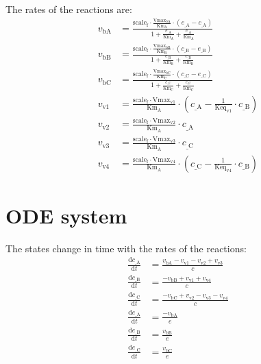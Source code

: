 \documentclass{article}
\begin{document}
The rates of the reactions are:
\begin{align*}
  v_{\mathrm{bA}} &= \frac{\mathrm{scale}_{\mathrm{f}} \cdot \frac{\mathrm{Vmax}_{\mathrm{bA}}}{\mathrm{Km}_{\mathrm{A}}} \cdot \mathopen{}\left(e_{\mathrm{\_A}} - c_{\mathrm{\_A}}\right)}{1 + \frac{e_{\mathrm{\_A}}}{\mathrm{Km}_{\mathrm{A}}} + \frac{c_{\mathrm{\_A}}}{\mathrm{Km}_{\mathrm{A}}}} \\
  v_{\mathrm{bB}} &= \frac{\mathrm{scale}_{\mathrm{f}} \cdot \frac{\mathrm{Vmax}_{\mathrm{bB}}}{\mathrm{Km}_{\mathrm{B}}} \cdot \mathopen{}\left(c_{\mathrm{\_B}} - e_{\mathrm{\_B}}\right)}{1 + \frac{e_{\mathrm{\_B}}}{\mathrm{Km}_{\mathrm{B}}} + \frac{c_{\mathrm{\_B}}}{\mathrm{Km}_{\mathrm{B}}}} \\
  v_{\mathrm{bC}} &= \frac{\mathrm{scale}_{\mathrm{f}} \cdot \frac{\mathrm{Vmax}_{\mathrm{bC}}}{\mathrm{Km}_{\mathrm{C}}} \cdot \mathopen{}\left(c_{\mathrm{\_C}} - e_{\mathrm{\_C}}\right)}{1 + \frac{e_{\mathrm{\_C}}}{\mathrm{Km}_{\mathrm{C}}} + \frac{c_{\mathrm{\_C}}}{\mathrm{Km}_{\mathrm{C}}}} \\
  v_{\mathrm{v1}} &= \frac{\mathrm{scale}_{\mathrm{f}} \cdot \mathrm{Vmax}_{\mathrm{v1}}}{\mathrm{Km}_{\mathrm{A}}} \cdot \mathopen{}\left(c_{\mathrm{\_A}} - \frac{1}{\mathrm{Keq}_{\mathrm{v1}}} \cdot c_{\mathrm{\_B}}\right) \\
  v_{\mathrm{v2}} &= \frac{\mathrm{scale}_{\mathrm{f}} \cdot \mathrm{Vmax}_{\mathrm{v2}}}{\mathrm{Km}_{\mathrm{A}}} \cdot c_{\mathrm{\_A}} \\
  v_{\mathrm{v3}} &= \frac{\mathrm{scale}_{\mathrm{f}} \cdot \mathrm{Vmax}_{\mathrm{v3}}}{\mathrm{Km}_{\mathrm{A}}} \cdot c_{\mathrm{\_C}} \\
  v_{\mathrm{v4}} &= \frac{\mathrm{scale}_{\mathrm{f}} \cdot \mathrm{Vmax}_{\mathrm{v4}}}{\mathrm{Km}_{\mathrm{A}}} \cdot \mathopen{}\left(c_{\mathrm{\_C}} - \frac{1}{\mathrm{Keq}_{\mathrm{v4}}} \cdot c_{\mathrm{\_B}}\right)
\end{align*}

\section{ODE system}

The states change in time with the rates of the reactions:
\begin{align*}
  \frac{\mathrm{d} c_{\mathrm{\_A}}}{\mathrm{d} t} &= \frac{v_{\mathrm{bA}} - v_{\mathrm{v1}} - v_{\mathrm{v2}} + v_{\mathrm{v3}}}{c} \\
  \frac{\mathrm{d} c_{\mathrm{\_B}}}{\mathrm{d} t} &= \frac{-v_{\mathrm{bB}} + v_{\mathrm{v1}} + v_{\mathrm{v4}}}{c} \\
  \frac{\mathrm{d} c_{\mathrm{\_C}}}{\mathrm{d} t} &= \frac{-v_{\mathrm{bC}} + v_{\mathrm{v2}} - v_{\mathrm{v3}} - v_{\mathrm{v4}}}{c} \\
  \frac{\mathrm{d} e_{\mathrm{\_A}}}{\mathrm{d} t} &= \frac{-v_{\mathrm{bA}}}{e} \\
  \frac{\mathrm{d} e_{\mathrm{\_B}}}{\mathrm{d} t} &= \frac{v_{\mathrm{bB}}}{e} \\
  \frac{\mathrm{d} e_{\mathrm{\_C}}}{\mathrm{d} t} &= \frac{v_{\mathrm{bC}}}{e}
\end{align*}
\end{document}
